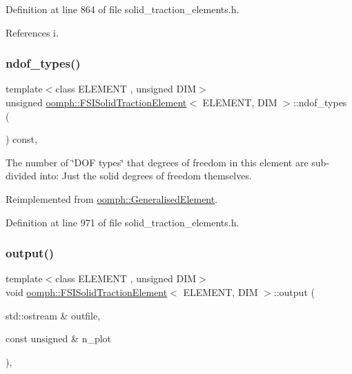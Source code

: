 Definition at line 864 of file solid\+\_\+traction\+\_\+elements.\+h.



References i.

\mbox{\label{classoomph_1_1FSISolidTractionElement_a1b45927afbb43a1808b5857128995ae4}} 
\subsubsection{\texorpdfstring{ndof\+\_\+types()}{ndof\_types()}}
{\footnotesize\ttfamily template$<$class E\+L\+E\+M\+E\+NT , unsigned D\+IM$>$ \\
unsigned \hyperlink{classoomph_1_1FSISolidTractionElement}{oomph\+::\+F\+S\+I\+Solid\+Traction\+Element}$<$ E\+L\+E\+M\+E\+NT, D\+IM $>$\+::ndof\+\_\+types (\begin{DoxyParamCaption}{ }\end{DoxyParamCaption}) const\hspace{0.3cm}{\ttfamily [inline]}, {\ttfamily [virtual]}}



The number of \char`\"{}\+D\+O\+F types\char`\"{} that degrees of freedom in this element are sub-\/divided into\+: Just the solid degrees of freedom themselves. 



Reimplemented from \hyperlink{classoomph_1_1GeneralisedElement_a0c6037a870597b35dcf1c780710b9a56}{oomph\+::\+Generalised\+Element}.



Definition at line 971 of file solid\+\_\+traction\+\_\+elements.\+h.

\mbox{\label{classoomph_1_1FSISolidTractionElement_a8f4008e86ceefec5f6678cdf37e49eb8}} 
\subsubsection{\texorpdfstring{output()}{output()}}
{\footnotesize\ttfamily template$<$class E\+L\+E\+M\+E\+NT , unsigned D\+IM$>$ \\
void \hyperlink{classoomph_1_1FSISolidTractionElement}{oomph\+::\+F\+S\+I\+Solid\+Traction\+Element}$<$ E\+L\+E\+M\+E\+NT, D\+IM $>$\+::output (\begin{DoxyParamCaption}\item[{std\+::ostream \&}]{outfile,  }\item[{const unsigned \&}]{n\+\_\+plot }\end{DoxyParamCaption})\hspace{0.3cm}{\ttfamily [inline]}, {\ttfamily [virtual]}}



